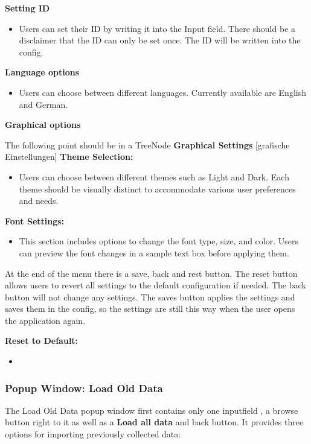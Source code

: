 \documentclass[]{scrreprt}
\begin{document}
\textbf{Setting ID}
\begin{itemize}
    \item Users can set their ID by writing it into the Input field. There should be a disclaimer that the ID can only be set once. 
    The ID will be written into the config. 
\end{itemize}

\textbf{Language options}
\begin{itemize}
  \item  Users can choose between different languages. Currently available are English and German. 
\end{itemize}

\textbf{Graphical options}

The following point should be in a TreeNode \textbf{Graphical Settings} [grafische Einstellungen]
\textbf{Theme Selection:}
\begin{itemize}
    \item Users can choose between different themes such as Light and Dark. Each theme should be visually distinct to accommodate various user preferences and needs.
\end{itemize}

\textbf{Font Settings:}
\begin{itemize}
    \item This section includes options to change the font type, size, and color. Users can preview the font changes in a sample text box before applying them.
\end{itemize}

At the end of the menu there is a save, back and rest button. The reset button allows users to revert all settings to the default configuration if needed. The back button will not change any settings.
The saves button applies the settings and saves them in the config, so the settings are still this way when the user opens the application again. 

\textbf{Reset to Default:}
\begin{itemize}
    \item 
\end{itemize}

\subsubsection{Popup Window: Load Old Data} \label{cap:PopupWindow_loadoldata}

The Load Old Data popup window first contains only one inputfield , a browse button right to it as well as a \textbf{Load all data} and back button. 
It provides three options for importing previously collected data:
\end{document}
